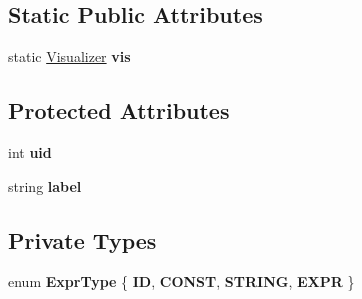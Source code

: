 \subsection*{Static Public Attributes}
\begin{DoxyCompactItemize}
\item 
\hypertarget{classAST_aca9e6637209b31e03a09c0d42f29bdfa}{static \hyperlink{classVisualizer}{Visualizer} {\bfseries vis}}\label{classAST_aca9e6637209b31e03a09c0d42f29bdfa}

\end{DoxyCompactItemize}
\subsection*{Protected Attributes}
\begin{DoxyCompactItemize}
\item 
\hypertarget{classAST_a847b778f1c3dd5a19de32de432ee6e15}{int {\bfseries uid}}\label{classAST_a847b778f1c3dd5a19de32de432ee6e15}

\item 
\hypertarget{classAST_ab2e239ccc0688d2341724432ff5a1a31}{string {\bfseries label}}\label{classAST_ab2e239ccc0688d2341724432ff5a1a31}

\end{DoxyCompactItemize}
\subsection*{Private Types}
\begin{DoxyCompactItemize}
\item 
enum {\bfseries Expr\-Type} \{ {\bfseries I\-D}, 
{\bfseries C\-O\-N\-S\-T}, 
{\bfseries S\-T\-R\-I\-N\-G}, 
{\bfseries E\-X\-P\-R}
 \}
\end{DoxyCompactItemize}
